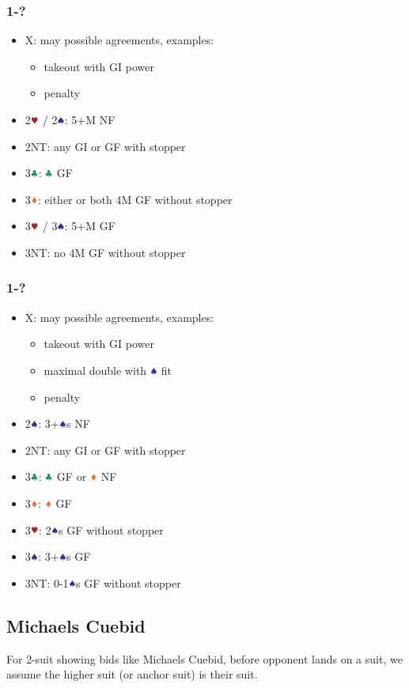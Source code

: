 \documentclass{article}
\begin{document}
\begin{multicols}{2}
\begin{CJK*}{UTF8}{gt}
\subsubsection{1\DDD-?}
\begin{itemize}
    \item X: may possible agreements, examples:
    \begin{itemize}
        \item takeout with GI power
        \item penalty
    \end{itemize}
    \item 2$\hhh$ / 2$\sss$: 5+M NF
    \item 2NT: any GI or GF with stopper
    \item 3$\ccc$: $\ccc$ GF
    \item 3$\ddd$: either or both 4M GF without stopper
    \item 3$\hhh$ / 3$\sss$: 5+M GF
    \item 3NT: no 4M GF without stopper
\end{itemize}

\subsubsection{1\HHH-?}
\begin{itemize}
    \item X: may possible agreements, examples:
    \begin{itemize}
        \item takeout with GI power
        \item maximal double with $\sss$ fit
        \item penalty
    \end{itemize}
    \item 2$\sss$: 3+$\sss$s NF
    \item 2NT: any GI or GF with stopper
    \item 3$\ccc$: $\ccc$ GF or $\ddd$ NF
    \item 3$\ddd$: $\ddd$ GF
    \item 3$\hhh$: 2$\sss$s GF without stopper
    \item 3$\sss$: 3+$\sss$s GF
    \item 3NT: 0-1$\sss$s GF without stopper
\end{itemize}

\subsection{Michaels Cuebid}
For 2-suit showing bids like Michaels Cuebid, before opponent lands on a suit, we assume the higher suit (or anchor suit) is their suit.

\end{CJK*}
\end{multicols}
\end{document}
